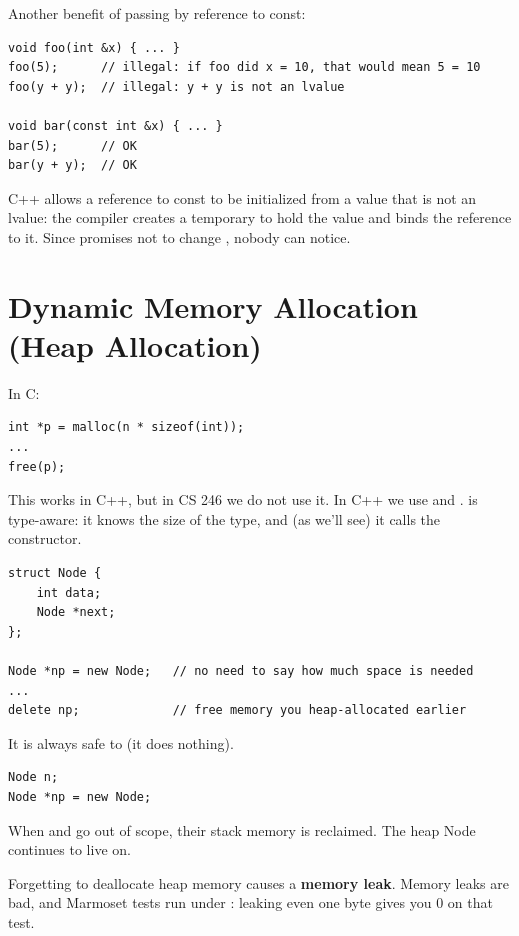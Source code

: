 Another benefit of passing by reference to const:
\begin{lstlisting}[style=cpp]
void foo(int &x) { ... }
foo(5);      // illegal: if foo did x = 10, that would mean 5 = 10
foo(y + y);  // illegal: y + y is not an lvalue

void bar(const int &x) { ... }
bar(5);      // OK
bar(y + y);  // OK
\end{lstlisting}
C++ allows a reference to const to be initialized from a value that is not an
lvalue: the compiler creates a temporary to hold the value and binds the
reference to it. Since  promises not to change , nobody can
notice.

\section{Dynamic Memory Allocation (Heap Allocation)}
In C:
\begin{lstlisting}[style=c]
int *p = malloc(n * sizeof(int));
...
free(p);
\end{lstlisting}
This works in C++, but in CS 246 we do not use it. In C++ we use  and
.  is type-aware: it knows the size of the type, and (as
we'll see) it calls the constructor.
\begin{lstlisting}[style=cpp]
struct Node {
    int data;
    Node *next;
};

Node *np = new Node;   // no need to say how much space is needed
...
delete np;             // free memory you heap-allocated earlier
\end{lstlisting}
It is always safe to  (it does nothing).

\begin{lstlisting}[style=cpp]
Node n;
Node *np = new Node;
\end{lstlisting}
\begin{center}
\end{center}
When  and  go out of scope, their stack memory is reclaimed.
The heap Node continues to live on.

\begin{important}
Forgetting to deallocate heap memory causes a \textbf{memory leak}. Memory leaks
are bad, and Marmoset tests run under : leaking even one byte gives
you 0 on that test.
\end{important}


